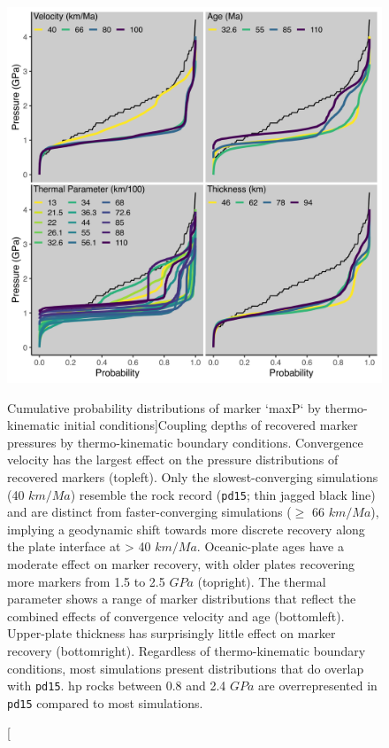 \begin{figure}[htbp]

{\centering \includegraphics[width=1\linewidth,]{assets/figs/chpt4/ecdfs} 

}

\caption[Cumulative probability distributions of marker `maxP` by thermo-kinematic initial conditions]{Coupling depths of recovered marker pressures by thermo-kinematic boundary conditions. Convergence velocity has the largest effect on the pressure distributions of recovered markers (topleft). Only the slowest-converging simulations (40 \(km/Ma\)) resemble the rock record (\texttt{pd15}; thin jagged black line) and are distinct from faster-converging simulations (\(\geq\) 66 \(km/Ma\)), implying a geodynamic shift towards more discrete recovery along the plate interface at \textgreater{} 40 \(km/Ma\). Oceanic-plate ages have a moderate effect on marker recovery, with older plates recovering more markers from 1.5 to 2.5 \(GPa\) (topright). The thermal parameter shows a range of marker distributions that reflect the combined effects of convergence velocity and age (bottomleft). Upper-plate thickness has surprisingly little effect on marker recovery (bottomright). Regardless of thermo-kinematic boundary conditions, most simulations present distributions that do overlap with \texttt{pd15}. \gls{hp} rocks between 0.8 and 2.4 \(GPa\) are overrepresented in \texttt{pd15} compared to most simulations.}\label{fig:ecdfs}
\end{figure}

